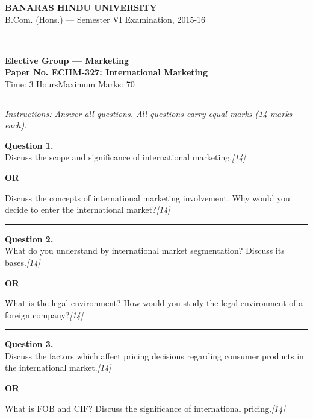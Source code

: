 \documentclass[11pt,a4paper]{article}
\newcommand{\pts}[1]{\hfill   \textit{[#1]}}
\begin{document}
\begin{center}
  {\large\bfseries BANARAS HINDU UNIVERSITY}\\[2pt]
  {\normalsize B.Com. (Hons.) --- Semester VI Examination, 2015-16}\\[6pt]
  \rule{0.8\linewidth}{0.5pt}\\[6pt]
  {\large\bfseries Elective Group --- Marketing}\\[4pt]
  {\large\bfseries Paper No. ECHM-327: International Marketing}\\[4pt]
  {\normalsize Time: 3 Hours\hfill Maximum Marks: 70}
\end{center}

\rule{\linewidth}{0.4pt}

\smallskip



\noindent   \textit{Instructions: Answer all questions. All questions carry equal marks (14 marks each).}

\bigskip




\noindent   \textbf{Question 1.} \\
Discuss the scope and significance of international marketing.\pts{14}

\centerline{   \textbf{OR}}

Discuss the concepts of international marketing involvement. Why would you decide to enter the international market?\pts{14}

\medskip\rule{\linewidth}{0.2pt}




\noindent   \textbf{Question 2.} \\
What do you understand by international market segmentation? Discuss its bases.\pts{14}

\centerline{   \textbf{OR}}

What is the legal environment? How would you study the legal environment of a foreign company?\pts{14}

\medskip\rule{\linewidth}{0.2pt}

\pagebreak




\noindent   \textbf{Question 3.} \\
Discuss the factors which affect pricing decisions regarding consumer products in the international market.\pts{14}

\centerline{   \textbf{OR}}

What is FOB and CIF? Discuss the significance of international pricing.\pts{14}
\end{document}
